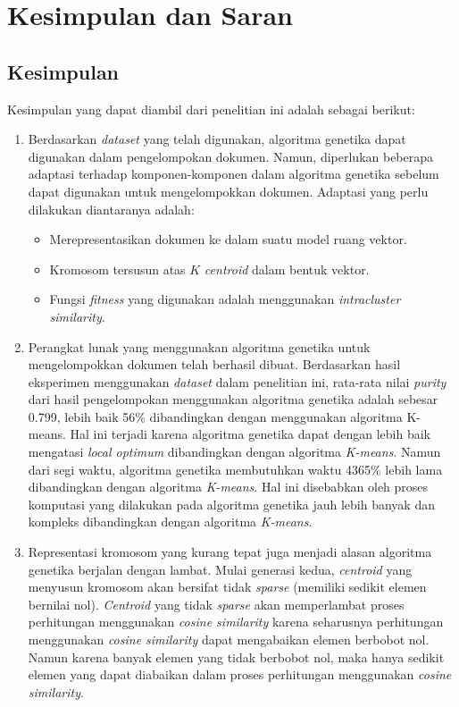 \chapter{Kesimpulan dan Saran}
\label{chap:kesimpulan}

\section{Kesimpulan}
Kesimpulan yang dapat diambil dari penelitian ini adalah sebagai berikut:

\begin{enumerate}
	\item Berdasarkan \textit{dataset} yang telah digunakan, algoritma genetika dapat digunakan dalam pengelompokan dokumen. Namun, diperlukan beberapa adaptasi terhadap komponen-komponen dalam algoritma genetika sebelum dapat digunakan untuk mengelompokkan dokumen. Adaptasi yang perlu dilakukan diantaranya adalah:
	\begin{itemize}
		\item Merepresentasikan dokumen ke dalam suatu model ruang vektor.
		\item Kromosom tersusun atas $K$ \textit{centroid} dalam bentuk vektor.
		\item Fungsi \textit{fitness} yang digunakan adalah menggunakan \textit{intracluster similarity}.
	\end{itemize}
	\item Perangkat lunak yang menggunakan algoritma genetika untuk mengelompokkan dokumen telah berhasil dibuat. Berdasarkan hasil eksperimen menggunakan \textit{dataset} dalam penelitian ini, rata-rata nilai \textit{purity} dari hasil pengelompokan menggunakan algoritma genetika adalah sebesar 0.799, lebih baik 56\% dibandingkan dengan menggunakan algoritma K-means. Hal ini terjadi karena algoritma genetika dapat dengan lebih baik mengatasi \textit{local optimum} dibandingkan dengan algoritma \textit{K-means}. Namun dari segi waktu, algoritma genetika membutuhkan waktu 4365\% lebih lama dibandingkan dengan algoritma \textit{K-means}. Hal ini disebabkan oleh proses komputasi yang dilakukan pada algoritma genetika jauh lebih banyak dan kompleks dibandingkan dengan algoritma \textit{K-means}.
	\item Representasi kromosom yang kurang tepat juga menjadi alasan algoritma genetika berjalan dengan lambat. Mulai generasi kedua, \textit{centroid} yang menyusun kromosom akan bersifat tidak \textit{sparse} (memiliki sedikit elemen bernilai nol). \textit{Centroid} yang tidak \textit{sparse} akan memperlambat proses perhitungan menggunakan \textit{cosine similarity} karena seharusnya perhitungan menggunakan \textit{cosine similarity} dapat mengabaikan elemen berbobot nol. Namun karena banyak elemen yang tidak berbobot nol, maka hanya sedikit elemen yang dapat diabaikan dalam proses perhitungan menggunakan \textit{cosine similarity}.

\end{enumerate}
